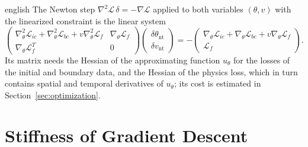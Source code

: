 \documentclass[11pt,letterpaper,twoside,openright]{book} %
\newcommand{\Loss}{\mathcal{L}}
\begin{document}
\begin{hyphenrules}{english}
The Newton step $\nabla^2\mathscr{L}\,\delta=-\nabla\mathscr{L}$ applied to both variables $(\theta,v)$
with the linearized constraint is the linear system \cite{boyd2004}
\begin{equation}
  \begin{pmatrix}
    \nabla^2_\theta\Loss_{ic}+\nabla^2_\theta\Loss_{bc}+v\nabla^2_\theta\Loss_f & \nabla_\theta\Loss_f\\
    \nabla_\theta\Loss_f^{T} & 0
  \end{pmatrix}
  \begin{pmatrix}\delta\theta_{\mathrm{nt}}\\ \delta v_{\mathrm{nt}}\end{pmatrix}
  =-\begin{pmatrix}\nabla_\theta\Loss_{ic}+\nabla_\theta\Loss_{bc}+v\nabla_\theta\Loss_f\\ \Loss_f\end{pmatrix}.
  \label{eq:newton-system}
\end{equation}
Its matrix needs the Hessian of the approximating function $u_\theta$ for the losses of the initial and
boundary data, and the Hessian of the physics loss, which in turn contains spatial and temporal
derivatives of $u_\theta$; its cost is estimated in Section~\ref{sec:optimization}.

\section{Stiffness of Gradient Descent}\label{app-sec:stiffness}


\end{hyphenrules}
\end{document}
